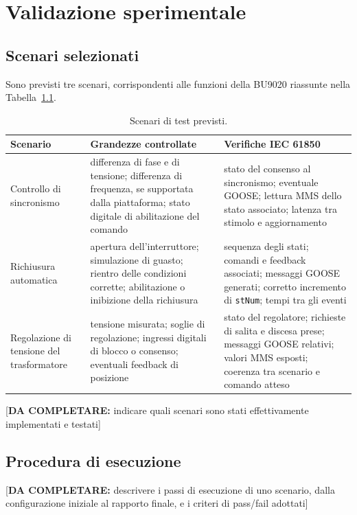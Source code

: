 \documentclass[11pt,a4paper,italian,oneside,openany]{book}
\newcommand{\daf}[1]{{\color{red}[\textbf{DA COMPLETARE:} #1]}}
\begin{document}
\chapter{Validazione sperimentale}\label{cap:validazione}
\section{Scenari selezionati}
Sono previsti tre scenari, corrispondenti alle funzioni della BU9020 riassunte nella Tabella~\ref{tab:scenari}.

\begin{table}[htbp]
\centering
\begin{tabular}{@{}p{2.8cm}p{4.8cm}p{5.4cm}@{}}
\toprule
\textbf{Scenario} & \textbf{Grandezze controllate} & \textbf{Verifiche IEC 61850} \\
\midrule
Controllo di sincronismo &
differenza di fase e di tensione; differenza di frequenza, se supportata dalla piattaforma; stato digitale di abilitazione del comando &
stato del consenso al sincronismo; eventuale GOOSE; lettura MMS dello stato associato; latenza tra stimolo e aggiornamento \\
\addlinespace
Richiusura automatica &
apertura dell'interruttore; simulazione di guasto; rientro delle condizioni corrette; abilitazione o inibizione della richiusura &
sequenza degli stati; comandi e feedback associati; messaggi GOOSE generati; corretto incremento di \texttt{stNum}; tempi tra gli eventi \\
\addlinespace
Regolazione di tensione del trasformatore &
tensione misurata; soglie di regolazione; ingressi digitali di blocco o consenso; eventuali feedback di posizione &
stato del regolatore; richieste di salita e discesa prese; messaggi GOOSE relativi; valori MMS esposti; coerenza tra scenario e comando atteso \\
\bottomrule
\end{tabular}
\caption{Scenari di test previsti.}
\label{tab:scenari}
\end{table}

\daf{indicare quali scenari sono stati effettivamente implementati e testati}

\section{Procedura di esecuzione}
\daf{descrivere i passi di esecuzione di uno scenario, dalla configurazione iniziale al rapporto finale, e i criteri di pass/fail adottati}
\end{document}
